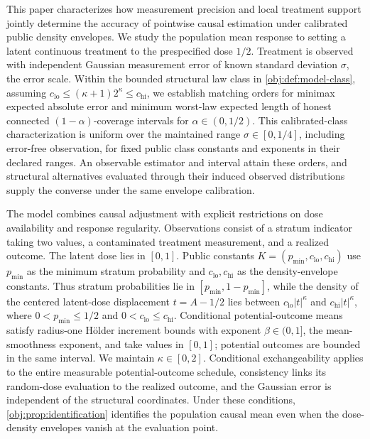\documentclass[11pt]{article}
\begin{document}
This paper characterizes how measurement precision and local treatment support jointly determine the accuracy of pointwise causal estimation under calibrated public density envelopes. We study the population mean response to setting a latent continuous treatment to the prespecified dose \(1/2\). Treatment is observed with independent Gaussian measurement error of known standard deviation \(\sigma\), the error scale. Within the bounded structural law class in \cref{obj:def:model-class}, assuming \(c_{\mathrm{lo}}\le(\kappa+1)2^\kappa\le c_{\mathrm{hi}}\), we establish matching orders for minimax expected absolute error and minimum worst-law expected length of honest connected \((1-\alpha)\)-coverage intervals for \(\alpha\in(0,1/2)\). This calibrated-class characterization is uniform over the maintained range \(\sigma\in[0,1/4]\), including error-free observation, for fixed public class constants and exponents in their declared ranges. An observable estimator and interval attain these orders, and structural alternatives evaluated through their induced observed distributions supply the converse under the same envelope calibration.

The model combines causal adjustment with explicit restrictions on dose availability and response regularity. Observations consist of a stratum indicator taking two values, a contaminated treatment measurement, and a realized outcome. The latent dose lies in \([0,1]\). Public constants \(K=(p_{\min},c_{\mathrm{lo}},c_{\mathrm{hi}})\) use \(p_{\min}\) as the minimum stratum probability and \(c_{\mathrm{lo}},c_{\mathrm{hi}}\) as the density-envelope constants. Thus stratum probabilities lie in \([p_{\min},1-p_{\min}]\), while the density of the centered latent-dose displacement \(t=A-1/2\) lies between \(c_{\mathrm{lo}}|t|^\kappa\) and \(c_{\mathrm{hi}}|t|^\kappa\), where \(0<p_{\min}\le1/2\) and \(0<c_{\mathrm{lo}}\le c_{\mathrm{hi}}\). Conditional potential-outcome means satisfy radius-one Hölder increment bounds with exponent \(\beta\in(0,1]\), the mean-smoothness exponent, and take values in \([0,1]\); potential outcomes are bounded in the same interval. We maintain \(\kappa\in[0,2]\). Conditional exchangeability applies to the entire measurable potential-outcome schedule, consistency links its random-dose evaluation to the realized outcome, and the Gaussian error is independent of the structural coordinates. Under these conditions, \cref{obj:prop:identification} identifies the population causal mean even when the dose-density envelopes vanish at the evaluation point.
\end{document}
